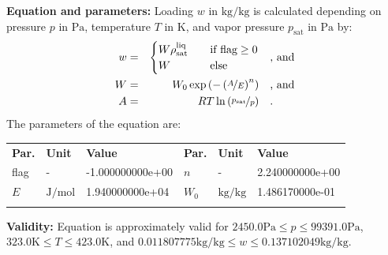 \textbf{Equation and parameters:}
\newline
%
Loading $w$ in $\si{\kilogram\per\kilogram}$ is calculated depending on pressure $p$ in $\si{\pascal}$, temperature $T$ in $\si{\kelvin}$, and vapor pressure $p_\mathrm{sat}$ in $\si{\pascal}$ by:
%
\begin{equation*}
\begin{split}
w &=& \begin{cases} W \rho_\mathrm{sat}^{\mathrm{liq}} & \quad \text{if flag} \geq 0 \\ W & \quad \text{else} \end{cases} & \quad\text{, and} \\
W &=& W_0 \exp \left( - \left( \nicefrac{A}{E} \right) ^{n} \right) & \quad\text{, and} \\
A &=& R T \ln \left( \nicefrac{p_\mathrm{sat}}{p} \right) & \quad\text{.} \\
\end{split}
\end{equation*}
%
The parameters of the equation are:
%
\begin{longtable}[l]{lll|lll}
\toprule
\addlinespace
\textbf{Par.} & \textbf{Unit} & \textbf{Value} &	\textbf{Par.} & \textbf{Unit} & \textbf{Value} \\
\addlinespace
\midrule
\endhead

\bottomrule
\endfoot
\bottomrule
\endlastfoot
\addlinespace

flag & - & -1.000000000e+00 & $n$ & - & 2.240000000e+00 \\
$E$ & $\si{\joule\per\mole}$ & 1.940000000e+04 & $W_0$ & $\si{\kilogram\per\kilogram}$ & 1.486170000e-01 \\

\addlinespace\end{longtable}

\textbf{Validity:}
\newline
Equation is approximately valid for $2450.0 \si{\pascal} \leq p \leq 99391.0 \si{\pascal}$,  $323.0 \si{\kelvin} \leq T \leq 423.0 \si{\kelvin}$, and $0.011807775 \si{\kilogram\per\kilogram} \leq w \leq 0.137102049 \si{\kilogram\per\kilogram}$.
\newline

